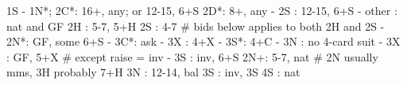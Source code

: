 1S - 1N*; 2C*: 16+, any; or 12-15, 6+S
2D*: 8+, any
   - 2S : 12-15, 6+S
   - other : nat and GF
2H : 5-7, 5+H
2S : 4-7
# bids below applies to both 2H and 2S
   - 2N*: GF, some 6+S
        - 3C*: ask
             - 3X : 4+X
             - 3S*: 4+C
             - 3N : no 4-card suit
   - 3X : GF, 5+X  # except raise = inv
   - 3S : inv, 6+S
2N+: 5-7, nat  # 2N usually mms, 3H probably 7+H
3N : 12-14, bal
3S : inv, 3S
4S : nat